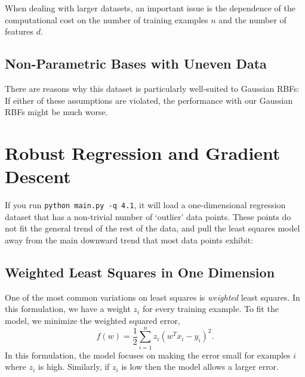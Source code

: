\documentclass{article}
\begin{document}
When dealing with larger datasets, an important issue is the dependence of the
computational cost on the number of training examples $n$ and the number of
features $d$. 


\subsection{Non-Parametric Bases with Uneven Data}

There are reasons why this dataset is particularly well-suited to Gaussian RBFs:
If either of these assumptions are violated, the performance with our Gaussian RBFs might be much worse.



\section{Robust Regression and Gradient Descent}

If you run \verb|python main.py -q 4.1|, it will load a one-dimensional regression 
dataset that has a non-trivial number of `outlier' data points. 
These points do not fit the general trend of the rest of the data, 
and pull the least squares model away from the main downward trend that most data points exhibit:

\subsection{Weighted Least Squares in One Dimension}

One of the most common variations on least squares is \emph{weighted} least squares. In this formulation, we have a weight $z_i$ for every training example. To fit the model, we minimize the weighted squared error,
\[
f(w) =  \frac{1}{2}\sum_{i=1}^n z_i(w^Tx_i - y_i)^2.
\]
In this formulation, the model focuses on making the error small for examples $i$ where $z_i$ is high. Similarly, if $z_i$ is low then the model allows a larger error.
\end{document}
